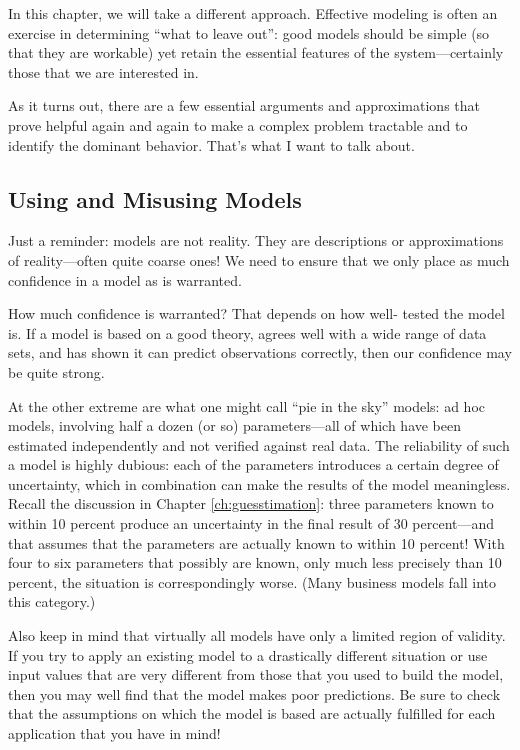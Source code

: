 In this chapter, we will take a different approach.  Effective
modeling is often an exercise in determining ``what to leave out'':
good models should be simple (so that they are workable) yet retain
the essential features of the system---certainly those that we are
interested in.

As it turns out, there are a few essential arguments and approximations
that prove helpful again and again to make a complex problem tractable
and to identify the dominant behavior. That's what I want to talk about.


\subsection{Using and Misusing Models}

Just a reminder: models are not reality. They are descriptions or
approximations of reality---often quite coarse ones! We need to ensure
that we only place as much confidence in a model as is warranted.

How much confidence is warranted? That depends on how well- tested the
model is. If a model is based on a good theory, agrees well with a
wide range of data sets, and has shown it can predict observations
correctly, then our confidence may be quite strong.

At the other extreme are what one might call ``pie in the sky''
models: ad hoc models, involving half a dozen (or so) parameters---all
of which have been estimated independently and not verified against
real data. The reliability of such a model is highly dubious: each of
the parameters introduces a certain degree of uncertainty, which in
combination can make the results of the model meaningless. Recall the
discussion in Chapter \ref{ch:guesstimation}: three parameters known
to within 10 percent produce an uncertainty in the final result of 30
percent---and that assumes that the parameters are actually known to
within 10 percent! With four to six parameters that possibly are known,
only much less precisely than 10 percent, the situation is
correspondingly worse.  (Many business models fall into this
category.)

Also keep in mind that virtually all models have only a limited region
of validity. If you try to apply an existing model to a drastically
different situation or use input values that are very different from
those that you used to build the model, then you may well find that
the model makes poor predictions. Be sure to check that the
assumptions on which the model is based are actually fulfilled for
each application that you have in mind!


